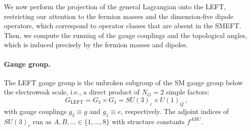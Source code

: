 We now perform the projection of the general Lagrangian onto the LEFT, restricting our attention to the fermion masses and the dimension-five dipole operators, which correspond to operator classes that are absent in the SMEFT. 
Then, we compute the running of the gauge couplings and the topological angles, which is induced precisely by the fermion masses and dipoles.

\paragraph{Gauge group.}
The LEFT gauge group is the unbroken subgroup of the SM gauge group below the electroweak scale, i.e., a direct product of $N_G=2$ simple factors:
\begin{equation}
    G_{\text{LEFT}} = G_3 \times G_1 = SU(3)_c\times U(1)_Q\,,
\end{equation}
with gauge couplings $g_3 \equiv g$ and $g_1 \equiv e$, respectively. The adjoint indices of $SU(3)_c$ run as $A,B,\dotsc \in \{1,\dotsc,8\}$ with structure constants $f^{ABC}$.

